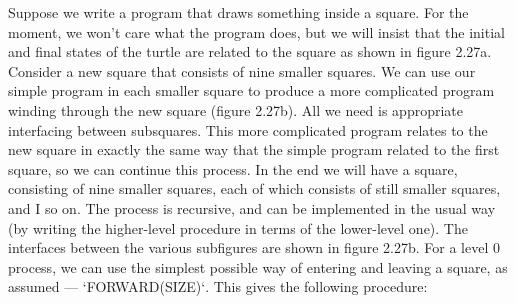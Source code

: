 \documentclass{book}
\begin{document}
Suppose we write a program that draws something inside a square. For
the moment, we won't care what the program does, but we will insist
that the initial and final states of the turtle are related to the square
as shown in figure 2.27a. Consider a new square that consists of nine
smaller squares. We can use our simple program in each smaller square
to produce a more complicated program winding through the new square
(figure 2.27b). All we need is appropriate interfacing between subsquares.
This more complicated program relates to the new square in exactly
the same way that the simple program related to the first square, so we
can continue this process. In the end we will have a square, consisting of
nine smaller squares, each of which consists of still smaller squares, and
I so on. The process is recursive, and can be implemented in the usual
way (by writing the higher-level procedure in terms of the lower-level
one). The interfaces between the various subfigures are shown in figure
2.27b. For a level 0 process, we can use the simplest possible way of
entering and leaving a square, as assumed --- \textsc{`FORWARD(SIZE)`}. This gives
the following procedure:
\end{document}
